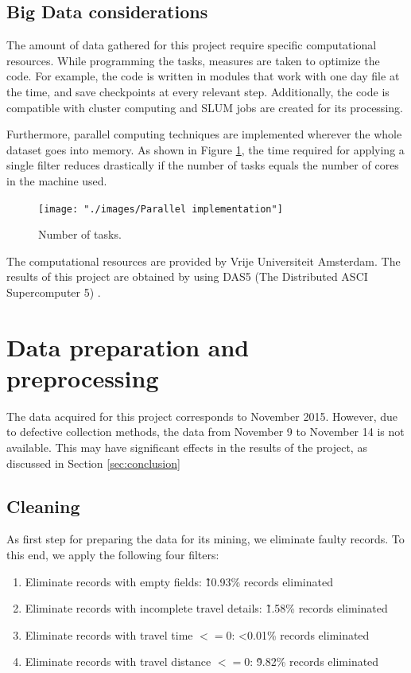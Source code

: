 \documentclass{article}
\begin{document}
\subsection{Big Data considerations}
The amount of data gathered for this project require specific computational resources. While programming the tasks, measures are taken to optimize the code. For example, the code is written in modules that work with one day file at the time, and save checkpoints at every relevant step. Additionally, the code is compatible with cluster computing and SLUM jobs are created for its processing.

Furthermore, parallel computing techniques are implemented wherever the whole dataset goes into memory. As shown in Figure \ref{fig:bigdata/parallel}, the time required for applying a single filter reduces drastically if the number of tasks equals the number of cores in the machine used. 

\begin{figure}[H]
  \centering
  \texttt{[image: "./images/Parallel implementation"]}
  \caption{Number of tasks.}
  \label{fig:bigdata/parallel}
\end{figure}

The computational resources are provided by Vrije Universiteit Amsterdam. The results of this project are obtained by using DAS5 (The Distributed ASCI Supercomputer 5) \cite{bal2016medium}. 

\newpage
\section{Data preparation and preprocessing}
\label{sec:partI}
The data acquired for this project corresponds to November 2015. However, due to defective collection methods, the data from November 9 to November 14 is not available. This may have significant effects in the results of the project, as discussed in Section \ref{sec:conclusion}

\subsection{Cleaning}
As first step for preparing the data for its mining, we eliminate faulty records. To this end, we apply the following four filters:

\begin{enumerate}
\item Eliminate records with empty fields: \~10.93\% records eliminated
\item Eliminate records with incomplete travel details: \~1.58\% records eliminated
\item Eliminate records with travel time $<= 0$: <0.01\% records eliminated
\item Eliminate records with travel distance $<= 0$: \~9.82\% records eliminated
\end{enumerate}
\end{document}
